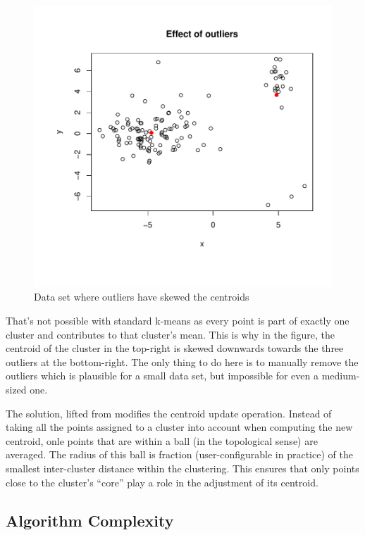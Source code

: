 \documentclass{article}
\begin{document}
\begin{figure}[H]
    \caption{Data set where outliers have skewed the centroids}
    \includegraphics[scale=0.7]{outliers.pdf}
\end{figure}

That's not possible with standard k-means as every point is part of exactly one
cluster and contributes to that cluster's mean. This is why in the figure, the
centroid of the cluster in the top-right is skewed downwards towards the three
outliers at the bottom-right. The only thing to do here is to manually remove
the outliers which is plausible for a small data set, but impossible for even a
medium-sized one.

The solution, lifted from \cite{Ostrovsky} modifies the centroid update
operation. Instead of taking all the points assigned to a cluster into account
when computing the new centroid, onle points that are within a ball (in the
topological sense) are averaged.
The radius of this ball is fraction (user-configurable in practice) of the
smallest inter-cluster distance within the clustering. This ensures that only
points close to the cluster's ``core'' play a role in the adjustment of its
centroid.

\subsection{Algorithm Complexity}
\end{document}
